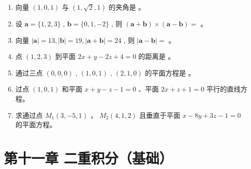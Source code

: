 \documentclass[12pt, a4paper]{article}
\begin{document}
\begin{enumerate}
    \item 向量 $ (1,0,1) $ 与 $ (1,\sqrt{2},1) $ 的夹角是 \underline{\hspace{2cm}}。

    \item 设 $ \mathbf{a} = \{1, 2, 3\} $ , $ \mathbf{b} = \{0, 1, -2\} $ , 则 $ (\mathbf{a} + \mathbf{b}) \times (\mathbf{a} - \mathbf{b}) = $ \underline{\hspace{2cm}}。

    \item 向量 $ \left|\mathbf{a}\right|=13,\left|\mathbf{b}\right|=19,\left|\mathbf{a}+\mathbf{b}\right|=24 $ , 则 $ \left|\mathbf{a}-\mathbf{b}\right|= $ \underline{\hspace{2cm}}。

    \item 点 $ (1,2,3) $ 到平面 $ 2x + y - 2z + 4 = 0 $ 的距离是 \underline{\hspace{2cm}}。

    \item 通过三点 $ (0,0,0) $ , $ (1,0,1) $ , $ (2,1,0) $ 的平面方程是 \underline{\hspace{2cm}}。

    \item 过点 $ (1,0,1) $ 和平面 $ x+y-z-1=0 $ 、平面 $ 2x+z+1=0 $ 平行的直线方程。

    \item 求通过点 $ M_{1}(3,-5,1) $ ， $ M_{2}(4,1,2) $ 且垂直于平面 $ x-8y+3z-1=0 $ 的平面方程。
\end{enumerate}

\section*{第十一章 二重积分（基础）}
\end{document}
